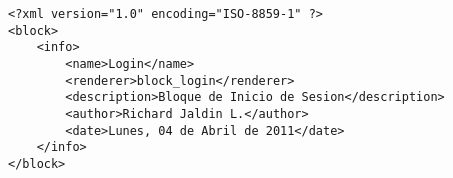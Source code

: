 \begin{lstlisting}[label=jha_block_login_info,caption=Informaci\'on del bloque.]
<?xml version="1.0" encoding="ISO-8859-1" ?>
<block>
    <info>
        <name>Login</name>
        <renderer>block_login</renderer>
        <description>Bloque de Inicio de Sesion</description>
        <author>Richard Jaldin L.</author>
        <date>Lunes, 04 de Abril de 2011</date>
    </info>
</block>
\end{lstlisting}
